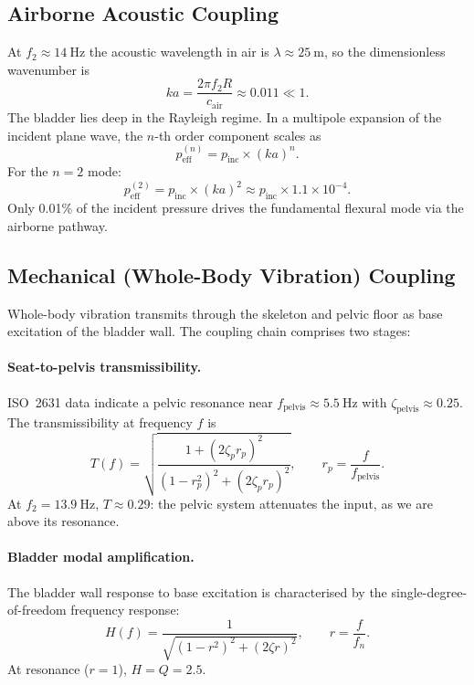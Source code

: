 \subsection{Airborne Acoustic Coupling}
\label{sec:airborne}

At $f_2 \approx \SI{14}{\hertz}$ the acoustic wavelength in air is
$\lambda \approx \SI{25}{\metre}$, so the dimensionless wavenumber is
\begin{equation}\label{eq:ka}
  ka = \frac{2\pi f_2 R}{c_\mathrm{air}} \approx 0.011 \ll 1.
\end{equation}
The bladder lies deep in the Rayleigh regime.  In a multipole expansion
of the incident plane wave, the $n$-th order component scales
as~\cite{Junger1986}
\begin{equation}\label{eq:peff}
  p_\mathrm{eff}^{(n)} = p_\mathrm{inc} \times (ka)^n.
\end{equation}
For the $n = 2$ mode:
\begin{equation}\label{eq:peff2}
  p_\mathrm{eff}^{(2)} = p_\mathrm{inc} \times (ka)^2
  \approx p_\mathrm{inc} \times 1.1 \times 10^{-4}.
\end{equation}
Only 0.01\% of the incident pressure drives the fundamental flexural mode
via the airborne pathway.


\subsection{Mechanical (Whole-Body Vibration) Coupling}
\label{sec:wbv}

Whole-body vibration transmits through the skeleton and pelvic floor as base
excitation of the bladder wall.  The coupling chain comprises two stages:

\paragraph{Seat-to-pelvis transmissibility.}
ISO~2631 data indicate a pelvic resonance near
$f_\mathrm{pelvis} \approx \SI{5.5}{\hertz}$ with $\zeta_\mathrm{pelvis}
\approx 0.25$.  The transmissibility at frequency $f$ is
\begin{equation}\label{eq:T_pelvis}
  T(f) = \sqrt{\frac{1 + (2\zeta_p r_p)^2}{(1 - r_p^2)^2 + (2\zeta_p r_p)^2}},
  \qquad r_p = \frac{f}{f_\mathrm{pelvis}}.
\end{equation}
At $f_2 = \SI{13.9}{\hertz}$, $T \approx 0.29$: the pelvic system
attenuates the input, as we are above its resonance.

\paragraph{Bladder modal amplification.}
The bladder wall response to base excitation is characterised by the
single-degree-of-freedom frequency response:
\begin{equation}\label{eq:H_bladder}
  H(f) = \frac{1}{\sqrt{(1 - r^2)^2 + (2\zeta r)^2}},
  \qquad r = \frac{f}{f_n}.
\end{equation}
At resonance ($r = 1$), $H = Q = 2.5$.

